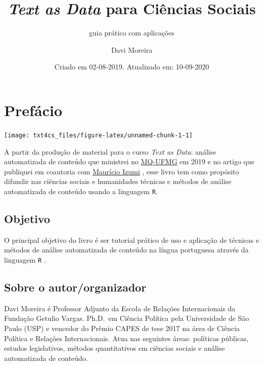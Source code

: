 \documentclass[]{book}
\title{\emph{Text as Data} para Ciências Sociais}
\subtitle{guia prático com aplicações}
\author{Davi Moreira}
\date{Criado em 02-08-2019. Atualizado em: 10-09-2020}
\begin{document}
\maketitle

{
\hypersetup{linkcolor=}
\setcounter{tocdepth}{1}
\tableofcontents
}
\hypertarget{prefuxe1cio}{%
\chapter*{Prefácio}\label{prefuxe1cio}}

\begin{center}\texttt{[image: txt4cs\_files/figure-latex/unnamed-chunk-1-1]} \end{center}

A partir da produção de material para o curso \emph{Text as Data}: análise automatizada de conteúdo que ministrei no \href{http://www.fafich.ufmg.br/~mq/}{MQ-UFMG} em 2019 e no artigo que publiquei em coautoria com \href{http://lattes.cnpq.br/2546701843557096}{Maurício Izumi} \citep{izumi_o_2018}, esse livro tem como propósito difundir nas ciências sociais e humanidades técnicas e métodos de análise automatizada de conteúdo usando a linguagem \texttt{R}.

\hypertarget{objetivo}{%
\section*{Objetivo}\label{objetivo}}

O principal objetivo do livro é ser tutorial prático de uso e aplicação de técnicas e métodos de análise automatizada de conteúdo na língua portuguesa através da linguagem \texttt{R} .

\hypertarget{sobre-o-autororganizador}{%
\section*{Sobre o autor/organizador}\label{sobre-o-autororganizador}}

Davi Moreira é Professor Adjunto da Escola de Relações Internacionais da Fundação Getulio Vargas. Ph.D.~em Ciência Política pela Universidade de São Paulo (USP) e vencedor do Prêmio CAPES de tese 2017 na área de Ciência Política e Relações Internacionais. Atua nas seguintes áreas: políticas públicas, estudos legislativos, métodos quantitativos em ciências sociais e análise automatizada de conteúdo.
\end{document}
